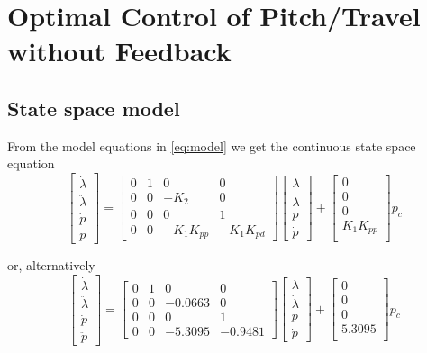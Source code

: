 \section{Optimal Control of Pitch/Travel without Feedback}\label{sec:prob2}
\label{text:problem2}

\subsection{State space model}
From the model equations in \eqref{eq:model} we get the continuous state space equation
\begin{equation*}
	\begin{bmatrix}
		\dot{\lambda}\\
		\ddot{\lambda}\\
		\dot{p}\\
		\ddot{p}
	\end{bmatrix} = 
	\begin{bmatrix}
		0 & 1 & 0 & 0 \\
		0 & 0 & -K_2 & 0 \\
		0 & 0 & 0 & 1 \\
		0 & 0 & -K_1K_{pp} & -K_1K_{pd}
	\end{bmatrix}
	\begin{bmatrix}
		\lambda	\\
		\dot{\lambda}		\\
		p		\\
		\dot{p}
	\end{bmatrix} +
	\begin{bmatrix}
		0 \\
		0 \\
		0 \\
		K_1K_{pp} \\
	\end{bmatrix}
	p_c
\end{equation*}

or, alternatively
\begin{equation*}
	\begin{bmatrix}
		\dot{\lambda}\\
		\ddot{\lambda}\\
		\dot{p}\\
		\ddot{p}
	\end{bmatrix} = 
	\begin{bmatrix}
		0 & 1 & 0 & 0 \\
		0 & 0 & -0.0663 & 0 \\
		0 & 0 & 0 & 1 \\
		0 & 0 & -5.3095 & -0.9481
	\end{bmatrix}
	\begin{bmatrix}
		\lambda	\\
		\dot{\lambda}		\\
		p		\\
		\dot{p}
	\end{bmatrix} +
	\begin{bmatrix}
		0 \\
		0 \\
		0 \\
		5.3095 \\
	\end{bmatrix}
	p_c
\end{equation*}

